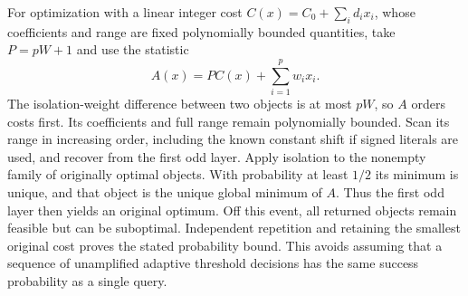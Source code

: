 For optimization with a linear integer cost
$C(x)=C_0+\sum_i d_ix_i$, whose coefficients and range are fixed
polynomially bounded quantities, take $P=pW+1$ and use the statistic
\begin{equation}\label{eq:lean-lexicographic}
 A(x)=P C(x)+\sum_{i=1}^p w_ix_i.
\end{equation}
The isolation-weight difference between two objects is at most $pW$,
so $A$ orders costs first. Its coefficients and full range remain
polynomially bounded. Scan its range in increasing order, including
the known constant shift if signed literals are used, and recover
from the first odd layer. Apply isolation to the nonempty family of
originally optimal objects. With probability at least $1/2$ its
minimum is unique, and that object is the unique global minimum of
$A$. Thus the first odd layer then yields an original optimum.
Off this event, all returned objects remain feasible but can be
suboptimal. Independent repetition and retaining the smallest
original cost proves the stated probability bound. This avoids
assuming that a sequence of unamplified adaptive threshold decisions
has the same success probability as a single query.

